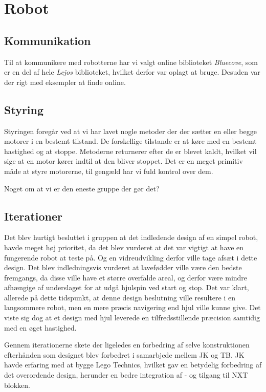 \chapter{Robot}

\section{Kommunikation}
Til at kommunikere med robotterne har vi valgt online biblioteket \textit{Bluecove}, som er en del af hele \textit{Lejos} biblioteket, hvilket derfor var oplagt at bruge. Desuden var der rigt med eksempler at finde online. 

\section{Styring}
Styringen foregår ved at vi har lavet nogle metoder der der sætter en eller begge motorer i en bestemt tilstand. De forskellige tilstande er at køre med en bestemt hastighed og at stoppe. Metoderne returnerer efter de er blevet kaldt, hvilket vil sige at en motor kører indtil at den bliver stoppet. Det er en meget primitiv måde at styre motorerne, til gengæld har vi fuld kontrol over dem.

Noget om at vi er den eneste gruppe der gør det?

\section{Iterationer}
Det blev hurtigt besluttet i gruppen at det indledende design af en simpel robot, havde meget høj prioritet, da det blev vurderet at det var vigtigt at have en fungerende robot at teste på. Og en vidreudvikling derfor ville tage afsæt i dette design.
Det blev indledningsvis vurderet at lavefødder ville være den bedste fremgangs, da disse ville have et større overfalde areal, og derfor være mindre afhængige af underslaget for at udgå hjulspin ved start og stop. Det var klart, allerede på dette tidspunkt, at denne design beslutning ville resultere i en langsommere robot, men en mere præcis navigering end hjul ville kunne give.
Det viste sig dog at et design med hjul leverede en tilfredsstillende præcision samtidig med en øget hastighed.


Gennem iterationerne skete der ligeledes en forbedring af selve konstruktionen efterhånden som designet blev forbedret i samarbjede mellem JK og TB. JK havde erfaring med at bygge Lego Technics, hvilket gav en betydelig forbedring af det overordende design, herunder en bedre integration af - og tilgang til NXT blokken.

